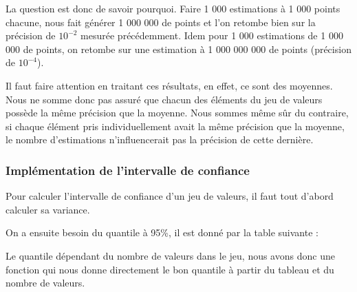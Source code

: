 \documentclass[a4paper]{article}
\begin{document}
La question est donc de savoir pourquoi. Faire 1 000 estimations à 1 000 points chacune, nous fait générer 1 000 000 de points
et l'on retombe bien sur la précision de $10^{-2}$ mesurée précédemment. 
Idem pour 1 000 estimations de 1 000 000 de points, on retombe sur une estimation à 1 000 000 000 de points (précision de $10^{-4}$).

Il faut faire attention en traitant ces résultats, en effet, ce sont des moyennes.
Nous ne somme donc pas assuré que chacun des éléments du jeu de valeurs possède la même précision que la moyenne.
Nous sommes même sûr du contraire, si chaque élément pris individuellement avait la même précision que la moyenne, le nombre d'estimations n'influencerait pas la précision de cette dernière.

\subsubsection{Implémentation de l'intervalle de confiance}

Pour calculer l'intervalle de confiance d'un jeu de valeurs, 
il faut tout d'abord calculer sa variance.
\smallskip
\begin{mdframed}[backgroundcolor=light-gray, roundcorner=20pt,
	leftmargin=-45, rightmargin=-45, 
	innerleftmargin=20, innertopmargin=1, innerbottommargin=1, 
	outerlinewidth=1, linecolor=darkgray]
	
\end{mdframed}

On a ensuite besoin du quantile à 95\%, il est donné par la table suivante :
\begin{mdframed}[backgroundcolor=light-gray, roundcorner=20pt,
	leftmargin=-45, rightmargin=-45, 
	innerleftmargin=20, innertopmargin=1, innerbottommargin=1, 
	outerlinewidth=1, linecolor=darkgray]
	
\end{mdframed}

Le quantile dépendant du nombre de valeurs dans le jeu, nous avons donc une fonction qui nous donne 
directement le bon quantile à partir du tableau et du nombre de valeurs.
\begin{mdframed}[backgroundcolor=light-gray, roundcorner=20pt,
	leftmargin=-45, rightmargin=-45, 
	innerleftmargin=20, innertopmargin=1, innerbottommargin=1, 
	outerlinewidth=1, linecolor=darkgray]
	
\end{mdframed}
\end{document}
